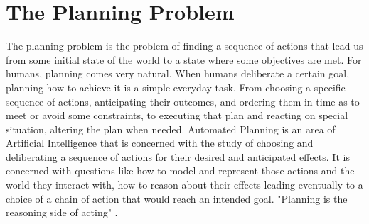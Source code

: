 \documentclass
[a4paper
,english
,parskip=half
,bibliography=totoc
]{scrreprt}
\begin{document}
    \section{The Planning Problem} \label{the_planning_problem}
    The planning problem is the problem of finding a sequence of actions that lead us from some initial state of the world to a state where some objectives are met. For humans, planning comes very natural. When humans deliberate a certain goal, planning how to achieve it is a simple everyday task. From choosing a specific sequence of actions, anticipating their outcomes, and ordering them in time as to meet or avoid some constraints, to executing that plan and reacting on special situation, altering the plan when needed. Automated Planning is an area of Artificial Intelligence that is concerned with the study of choosing and deliberating a sequence of actions for their desired and anticipated effects. It is concerned with questions like how to model and represent those actions and the world they interact with, how to reason about their effects leading eventually to a choice of a chain of action that would reach an intended goal.
    "Planning is the reasoning side of acting" \citep{automated_planning}.
\end{document}

